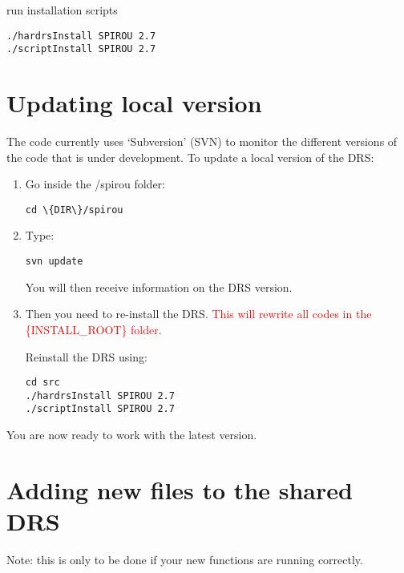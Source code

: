 run installation scripts

\begin{lstlisting}[style=bashstyle]
./hardrsInstall SPIROU 2.7
./scriptInstall SPIROU 2.7
\end{lstlisting}

\section{Updating local version}
\label{section:how_to_update}

The code currently uses `Subversion' (SVN) to monitor the different versions of the code that is under development. To update a local version of the DRS:

\begin{enumerate}
\item Go inside the /spirou folder:
\begin{lstlisting}[style=bashstyle]
cd \{DIR\}/spirou
\end{lstlisting}

\item Type:
\begin{lstlisting}[style=bashstyle]
svn update
\end{lstlisting}

You will then receive information on the DRS version.

\item Then you need to re-install the DRS. \textcolor{red}{This will rewrite all codes in the \{INSTALL\_ROOT\} folder}.

Reinstall the DRS using:
\begin{lstlisting}[style=bashstyle]
cd src
./hardrsInstall SPIROU 2.7
./scriptInstall SPIROU 2.7
\end{lstlisting}

\end{enumerate}

You are now ready to work with the latest version.


\section{Adding new files to the shared DRS}
\label{section:how_to_add}

Note: this is only to be done if your new functions are running correctly.

